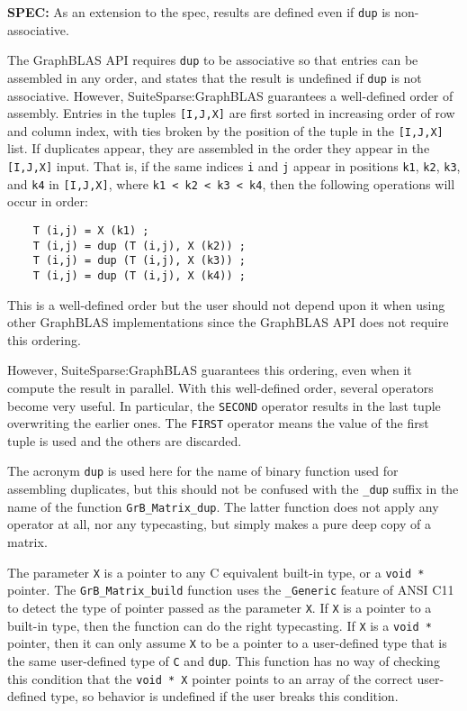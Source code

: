 \documentclass[12pt]{article}
\begin{document}
\begin{spec}
{\bf SPEC:} As an extension to the spec, results are defined even if \verb'dup' is non-associative.
\end{spec}

The GraphBLAS API requires \verb'dup' to be associative so
that entries can be assembled in any order, and states that the result is
undefined if \verb'dup' is not associative.  However, SuiteSparse:GraphBLAS
guarantees a well-defined order of assembly.  Entries in the tuples
\verb'[I,J,X]' are first sorted in increasing order of row and column index,
with ties broken by the position of the tuple in the \verb'[I,J,X]' list.  If
duplicates appear, they are assembled in the order they appear in the
\verb'[I,J,X]' input.  That is, if the same indices \verb'i' and \verb'j'
appear in positions \verb'k1', \verb'k2', \verb'k3', and \verb'k4' in
\verb'[I,J,X]', where \verb'k1 < k2 < k3 < k4', then the following operations
will occur in order:

    {\footnotesize
    \begin{verbatim}
    T (i,j) = X (k1) ;
    T (i,j) = dup (T (i,j), X (k2)) ;
    T (i,j) = dup (T (i,j), X (k3)) ;
    T (i,j) = dup (T (i,j), X (k4)) ; \end{verbatim}}

This is a well-defined order but the user should not depend upon it when using
other GraphBLAS implementations since the GraphBLAS API does not
require this ordering.

However, SuiteSparse:GraphBLAS guarantees this ordering, even when it compute
the result in parallel.  With this well-defined order, several operators become
very useful.  In particular, the \verb'SECOND' operator results in the last
tuple overwriting the earlier ones.  The \verb'FIRST' operator means the value
of the first tuple is used and the others are discarded.

The acronym \verb'dup' is used here for the name of binary function used for
assembling duplicates, but this should not be confused with the \verb'_dup'
suffix in the name of the function \verb'GrB_Matrix_dup'.  The latter function
does not apply any operator at all, nor any typecasting, but simply makes a
pure deep copy of a matrix.

The parameter \verb'X' is a pointer to any C equivalent built-in type, or a
\verb'void *' pointer.  The \verb'GrB_Matrix_build' function uses the
\verb'_Generic' feature of ANSI C11 to detect the type of pointer passed as the
parameter \verb'X'.  If \verb'X' is a pointer to a built-in type, then the
function can do the right typecasting.  If \verb'X' is a \verb'void *' pointer,
then it can only assume \verb'X' to be a pointer to a user-defined type that is
the same user-defined type of \verb'C' and \verb'dup'.  This function has no
way of checking this condition that the \verb'void * X' pointer points to an
array of the correct user-defined type, so behavior is undefined if the user
breaks this condition.
\end{document}
